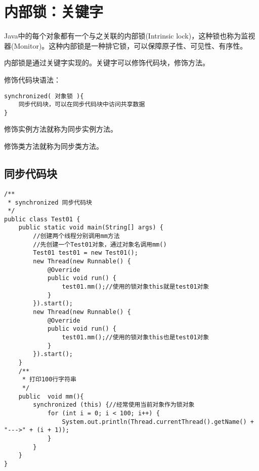\documentclass[a4paper]{report}
\begin{document}
\section{内部锁：关键字}
Java中的每个对象都有一个与之关联的内部锁(Intrinsic lock)，这种锁也称为监视器(Monitor)。这种内部锁是一种排它锁，可以保障原子性、可见性、有序性。

内部锁是通过关键字实现的。关键字可以修饰代码块，修饰方法。

修饰代码块语法：
\begin{lstlisting}
synchronized( 对象锁 ){
    同步代码块，可以在同步代码块中访问共享数据
}
\end{lstlisting}

修饰实例方法就称为同步实例方法。

修饰类方法就称为同步类方法。
\subsection{同步代码块}
\begin{lstlisting}
/**
 * synchronized 同步代码块
 */
public class Test01 {
    public static void main(String[] args) {
        //创建两个线程分别调用mm方法
        //先创建一个Test01对象，通过对象名调用mm()
        Test01 test01 = new Test01();
        new Thread(new Runnable() {
            @Override
            public void run() {
                test01.mm();//使用的锁对象this就是test01对象
            }
        }).start();
        new Thread(new Runnable() {
            @Override
            public void run() {
                test01.mm();//使用的锁对象this也是test01对象
            }
        }).start();
    }
    /**
     * 打印100行字符串
     */
    public  void mm(){
        synchronized (this) {//经常使用当前对象作为锁对象
            for (int i = 0; i < 100; i++) {
                System.out.println(Thread.currentThread().getName() + "--->" + (i + 1));
            }
        }
    }
}
\end{lstlisting}
\end{document}

